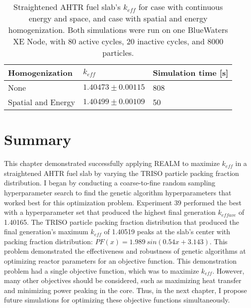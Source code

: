 \begin{table}[]
    \centering
    \onehalfspacing
    \caption{Straightened \acrfull{AHTR} fuel slab's $k_{eff}$ for case with 
    continuous energy and space, and case with spatial and energy homogenization. 
    Both simulations were run on one BlueWaters XE Node, with 80 active cycles, 
    20 inactive cycles, and 8000 particles.}
	\label{tab:keff_multigroup}
    \footnotesize
    \begin{tabular}{lll}
    \hline 
    \textbf{Homogenization}& \textbf{$k_{eff}$} & \textbf{Simulation time [s]}  \\
    \hline 
    None & $1.40473 \pm 0.00115$ & 808\\ 
    Spatial and Energy & $1.40499 \pm 0.00109$ & 50\\ 
    \hline
    \end{tabular}
\end{table}

\section{Summary}
This chapter demonstrated successfully applying \gls{REALM} to maximize $k_{eff}$ 
in a straightened \acrfull{AHTR} fuel slab by varying the \gls{TRISO} 
particle packing fraction distribution. 
I began by conducting a coarse-to-fine random sampling hyperparameter search to 
find the genetic algorithm hyperparameters that worked best for this optimization 
problem.
Experiment 39 performed the best with a hyperparameter set that produced the 
highest final generation $k_{eff ave}$ of 1.40165. 
The \gls{TRISO} particle packing fraction distribution that produced the final 
generation's maximum $k_{eff}$ of 1.40519 peaks at the slab's center with 
packing fraction distribution: $PF(x)=1.989\ sin(0.54x+3.143)$. 
This problem demonstrated the effectiveness and robustness of genetic algorithms 
at optimizing reactor parameters for an objective function. 
This demonstration problem had a single objective function, which was to maximize 
$k_{eff}$. 
However, many other objectives should be considered, such as maximizing heat 
transfer and minimizing power peaking in the core.
Thus, in the next chapter, I propose future simulations for optimizing
these objective functions simultaneously.
